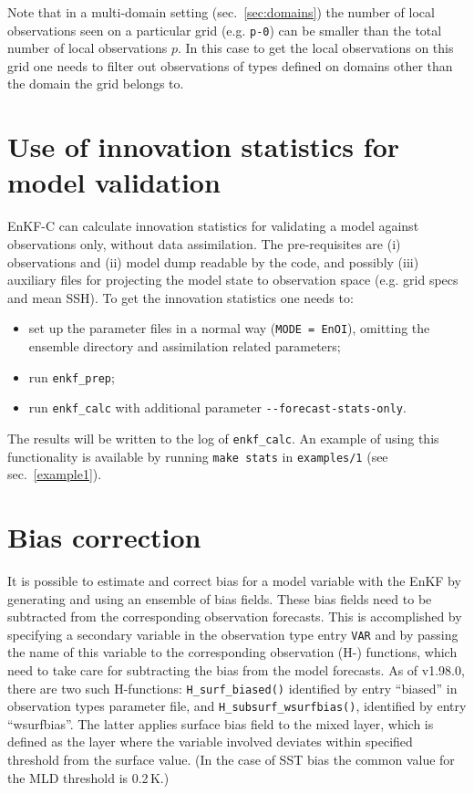 \documentclass[11pt]{report}
\begin{document}
Note that in a multi-domain setting (sec.~\ref{sec:domains}) the number of local observations seen on a particular grid (e.g. \verb|p-0|) can be smaller than the total number of local observations $p$.
In this case to get the local observations on this grid one needs to filter out observations of types defined on domains other than the domain the grid belongs to.

\section{Use of innovation statistics for model validation}

EnKF-C can calculate innovation statistics for validating a model against observations only, without data assimilation.
The pre-requisites are (i) observations and (ii) model dump readable by the code, and possibly (iii) auxiliary files for projecting the model state to observation space (e.g. grid specs and mean SSH).
To get the innovation statistics one needs to:
\begin{itemize}
\item set up the parameter files in a normal way (\verb|MODE = EnOI|), omitting the ensemble directory and assimilation related parameters;
\item run \verb|enkf_prep|;
\item run \verb|enkf_calc| with additional parameter \verb|--forecast-stats-only|.
\end{itemize}
The results will be written to the log of \verb|enkf_calc|. 
An example of using this functionality is available by running \verb|make stats| in \verb|examples/1| (see sec.~\ref{example1}).

\section{Bias correction}
\label{sec:bias}

It is possible to estimate and correct bias for a model variable with the EnKF by generating and using an ensemble of bias fields.
These bias fields need to be subtracted from the corresponding observation forecasts.
This is accomplished by specifying a secondary variable in the observation type entry \verb|VAR| and by passing the name of this variable to the corresponding observation (H-) functions, which need to take care for subtracting the bias from the model forecasts.
As of v1.98.0, there are two such H-functions: \verb|H_surf_biased()| identified by entry ``biased'' in observation types parameter file, and \verb|H_subsurf_wsurfbias()|, identified by entry ``wsurfbias''.
The latter applies surface bias field to the mixed layer, which is defined as the layer where the variable involved deviates within specified threshold from the surface value.
(In the case of SST bias the common value for the MLD threshold is 0.2\,K.)
\end{document}
